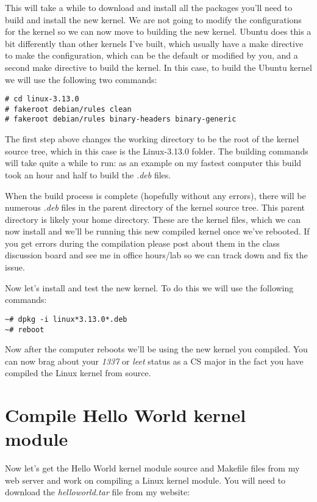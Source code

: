 \documentclass[11pt]{article}
\begin{document}
This will take a while to download and install all the packages you'll need to build and install the new kernel. We are not going to modify the configurations for the kernel so we can now move to building the new kernel. Ubuntu does this a bit differently than other kernels I've built, which usually have a make directive to make the configuration, which can be the default or modified by you, and a second make directive to build the kernel. In this case, to build the Ubuntu kernel we will use the following two commands:

\begin{verbatim}
# cd linux-3.13.0
# fakeroot debian/rules clean
# fakeroot debian/rules binary-headers binary-generic
\end{verbatim}

The first step above changes the working directory to be the root of the kernel source tree, which in this case is the Linux-3.13.0 folder. The building commands will take quite a while to run: as an example on my fastest computer this build took an hour and half to build the \emph{.deb} files. 

When the build process is complete (hopefully without any errors), there will be numerous \emph{.deb} files in the parent directory of the kernel source tree. This parent directory is likely your home directory. These are the kernel files, which we can now install and we'll be running this new compiled kernel once we've rebooted. If you get errors during the compilation please post about them in the class discussion board and see me in office hours/lab so we can track down and fix the issue.

Now let's install and test the new kernel. To do this we will use the following commands:

\begin{verbatim}
~# dpkg -i linux*3.13.0*.deb
~# reboot
\end{verbatim}

Now after the computer reboots we'll be using the new kernel you compiled. You can now brag about your \emph{1337} or \emph{leet} status as a CS major in the fact you have compiled the Linux kernel from source. 

\section*{Compile Hello World kernel module}

Now let's get the Hello World kernel module source and Makefile files from my web server and work on compiling a Linux kernel module. You will need to download the {\it helloworld.tar} file from my website:
\end{document}
